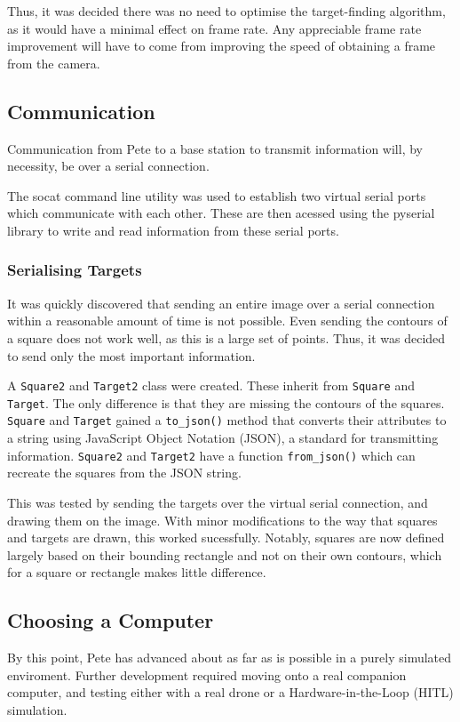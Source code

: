 \documentclass[11pt]{article}
\begin{document}
Thus, it was decided there was no need to optimise the target-finding algorithm, as it would have a minimal effect on frame rate. Any appreciable frame rate improvement will have to come from improving the speed of obtaining a frame from the camera.

\subsection{Communication}
Communication from Pete to a base station to transmit information will, by necessity, be over a serial connection.

The socat command line utility was used to establish two virtual serial ports which communicate with each other. These are then acessed using the pyserial library to write and read information from these serial ports.

\subsubsection{Serialising Targets}
It was quickly discovered that sending an entire image over a serial connection within a reasonable amount of time is not possible. Even sending the contours of a square does not work well, as this is a large set of points. Thus, it was decided to send only the most important information.

A \lstinline|Square2| and \lstinline|Target2| class were created. These inherit from \lstinline|Square| and \lstinline|Target|. The only difference is that they are missing the contours of the squares. \lstinline|Square| and \lstinline|Target| gained a \lstinline|to_json()| method that converts their attributes to a string using JavaScript Object Notation (JSON), a standard for transmitting information. \lstinline|Square2| and \lstinline|Target2| have a function \lstinline|from_json()| which can recreate the squares from the JSON string.

This was tested by sending the targets over the virtual serial connection, and drawing them on the image. With minor modifications to the way that squares and targets are drawn, this worked sucessfully. Notably, squares are now defined largely based on their bounding rectangle and not on their own contours, which for a square or rectangle makes little difference.

\subsection{Choosing a Computer}
By this point, Pete has advanced about as far as is possible in a purely simulated enviroment. Further development required moving onto a real companion computer, and testing either with a real drone or a Hardware-in-the-Loop (HITL) simulation.
\end{document}
